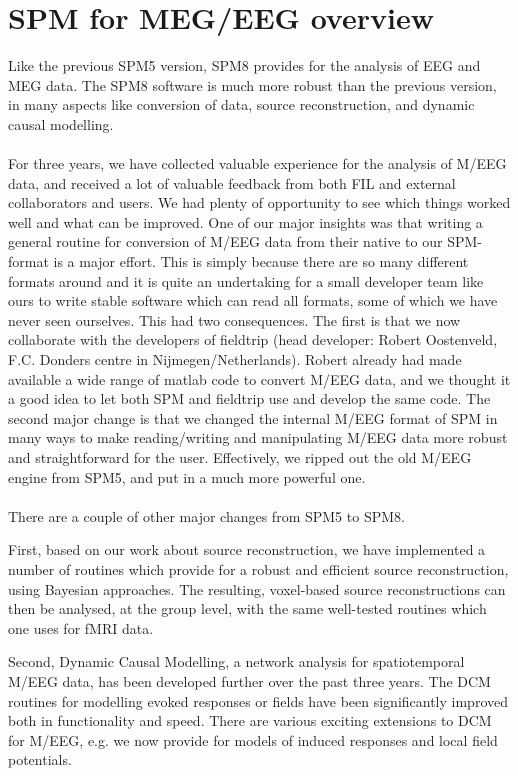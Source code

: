 \chapter{SPM for MEG/EEG overview \label{Chap:eeg:overview}}

Like the previous SPM5 version, SPM8 provides for the analysis of EEG
and MEG data. The SPM8 software is much more robust than the previous
version, in many aspects like conversion of data, source
reconstruction, and dynamic causal modelling.
\\
\\
For three years, we have collected valuable experience
for the analysis of M/EEG data, and received a lot of valuable
feedback from both FIL and external collaborators and users. We had
plenty of opportunity to see which things worked well and what can be
improved. One of our major insights was that writing a general routine
for conversion of M/EEG data from their native to our SPM-format is a
major effort. This is simply because there are so many different
formats 
around and it is quite an undertaking for a small developer team like
ours to write stable software which can read all formats, some of
which we have never seen ourselves. This had two consequences. The
first is that we now collaborate with the developers of fieldtrip
(head developer: Robert Oostenveld, F.C. Donders centre in
Nijmegen/Netherlands). Robert already had made available a wide range of
matlab code to convert M/EEG data, and we thought it a good idea to
let both SPM and fieldtrip use and develop the same code. The second
major change is that we changed the internal M/EEG format of SPM in
many ways to make reading/writing and manipulating M/EEG data more
robust and straightforward for the user. Effectively, we ripped out
the old M/EEG engine from SPM5, and put in a much more powerful one.
\\
\\
There are a couple of other major changes from SPM5 to SPM8. 

First, based on our work about source reconstruction, we have
implemented a number of routines which provide for a robust and
efficient source reconstruction, using Bayesian approaches. The
resulting, voxel-based source reconstructions can then be analysed, at
the group level, with the same well-tested routines which one uses for
fMRI data.

Second, Dynamic Causal Modelling, a network analysis for spatiotemporal
M/EEG data, has been developed further over the past three years. The
DCM routines for modelling evoked responses or 
fields have been significantly improved both in functionality and
speed. There are various exciting extensions to DCM for M/EEG, e.g. we
now provide for models of induced responses and local field
potentials. 

